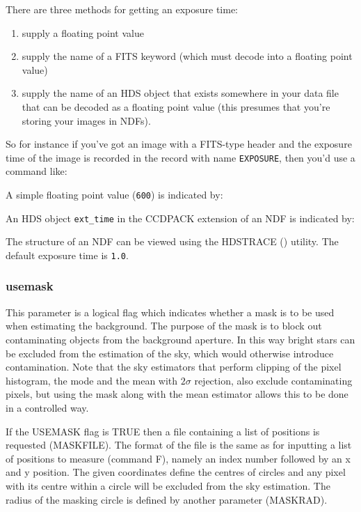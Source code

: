 \documentclass[twoside,11pt,nolof]{starlink}
\begin{document}
There are three methods for getting an exposure time:
\begin{enumerate}
\item supply a floating point value
\item supply the name of a FITS keyword (which must decode into a
  floating point value)
\item supply the name of an HDS object that exists somewhere in your
data file that can be decoded as a floating point value (this presumes
that you're storing your images in NDFs).
\end{enumerate}

So for instance if you've got an image with a FITS-type header and
the exposure time of the image is recorded in the record with name
\verb+EXPOSURE+, then you'd use a command like:
\begin{terminalv}
\end{terminalv}
A simple floating point value (\verb+600+) is indicated by:
\begin{terminalv}
\end{terminalv}
An HDS object \verb+ext_time+ in the CCDPACK extension of an NDF is
indicated by:
\begin{terminalv}
\end{terminalv}
The structure of an NDF can be viewed using the HDSTRACE
() utility. The default exposure time is
\verb+1.0+.


\subsubsection{usemask}

This parameter is a logical flag which indicates whether a mask is to be
used when estimating the background. The purpose of the mask is to block
out contaminating objects from the background aperture. In this way bright
stars can be excluded from the estimation of the sky, which would
otherwise introduce contamination. Note that the sky estimators that
perform clipping of the pixel histogram, the mode and the mean with
$2\sigma$ rejection, also exclude contaminating pixels, but using the mask
along with the mean estimator allows this to be done in a controlled way.

If the USEMASK flag is TRUE then a file containing a list of positions is
requested (MASKFILE). The format of the file is the same as for inputting
a list of positions to measure (command F), namely an index number
followed by an x and y position. The given coordinates define the
centres of circles and any pixel with its centre within a circle will be
excluded from the sky estimation. The radius of the masking circle is
defined by another parameter (MASKRAD).
\end{document}
